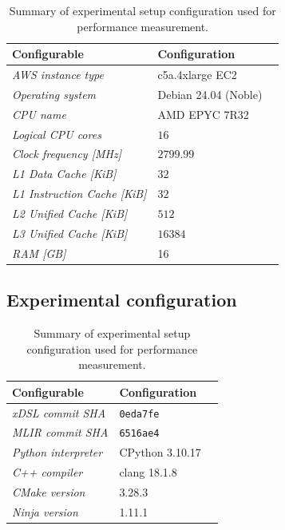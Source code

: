 \begin{table}[H]
  \caption{Summary of experimental setup configuration used for performance measurement.}
  \label{tab:experimental-setup}
  \centering
  \begin{tabular}{lll}
    \toprule
    \textbf{Configurable} & \textbf{Configuration} \\
    \midrule
    \textit{AWS instance type} & c5a.4xlarge EC2 \\
    \textit{Operating system} & Debian 24.04 (Noble) \\
    \textit{CPU name} & AMD EPYC 7R32 \\
    \textit{Logical CPU cores} & $16$ \\
    \textit{Clock frequency [MHz]} & $2799.99$ \\
    \textit{L1 Data Cache [KiB]} & $32$ \\
    \textit{L1 Instruction Cache [KiB]} & $32$ \\
    \textit{L2 Unified Cache [KiB]} & $512$ \\
    \textit{L3 Unified Cache [KiB]} & $16384$ \\
    \textit{RAM [GB]} & 16 \\
    \bottomrule
  \end{tabular}
\end{table}




\subsection{Experimental configuration}
\label{ssec:experimental-configuration}


\begin{table}[H]
  \caption{Summary of experimental setup configuration used for performance measurement.}
  \label{tab:experimental-configuration}
  \centering
  \begin{tabular}{lll}
    \toprule
    \textbf{Configurable} & \textbf{Configuration} \\
    \midrule
    \textit{xDSL commit SHA} & \texttt{0eda7fe} \\
    \textit{MLIR commit SHA} & \texttt{6516ae4} \\
    \midrule
    \textit{Python interpreter} & CPython 3.10.17 \\
    \textit{C++ compiler} & clang 18.1.8 \\
    \textit{CMake version} & 3.28.3 \\
    \textit{Ninja version} & 1.11.1 \\
    \bottomrule
  \end{tabular}
\end{table}



